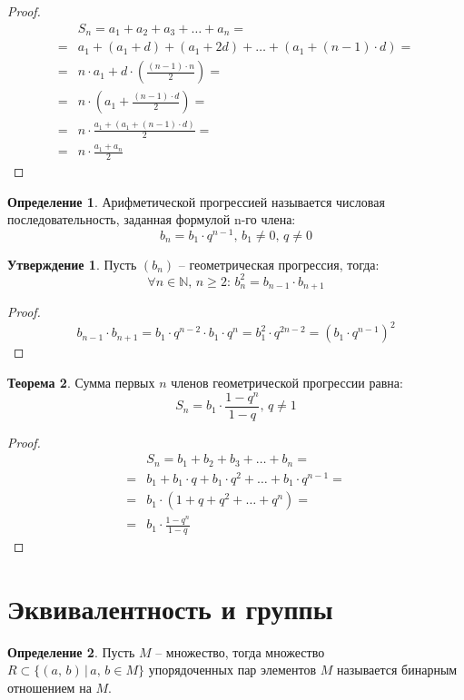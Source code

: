 \documentclass[12pt]{article}
\theoremstyle{definition}
\newtheorem{theorem}{Теорема}[section]
\newtheorem{definition}{Определение}
\newtheorem{statement}[theorem]{Утверждение}
\newcommand{\N}{\mathbb{N}}
\begin{document}
\begin{proof}
    \begin{align*}
        &S_n=a_1+a_2+a_3+\ldots+a_n=\\
        =&a_1+(a_1+d)+(a_1+2d)+\ldots+(a_1+(n-1)\cdot d)=\\
        =&n\cdot a_1+d\cdot \left( \frac{(n-1)\cdot n}{2} \right)=\\
        =&n\cdot \left(a_1+\frac{(n-1)\cdot d}{2} \right)=\\
        =&n \cdot \frac{a_1 + (a_1 + (n-1)\cdot d)}{2}=\\
        =&n\cdot \frac{a_1 + a_n}{2}
    \end{align*}
\end{proof}

\begin{definition}
    Арифметической прогрессией называется числовая последовательность, заданная формулой n-го члена:
    $$b_n=b_1 \cdot q^{n-1},\, b_1\neq0,\, q\neq0$$
\end{definition}

\begin{statement}
    Пусть $(b_n)$ -- геометрическая прогрессия, тогда: 
    $$\forall n\in \N,\, n\geq 2:\,b_n^2=b_{n-1}\cdot b_{n+1}$$
\end{statement}
\begin{proof}
    $$b_{n-1}\cdot b_{n+1}=b_1\cdot q^{n-2}\cdot b_1 \cdot q^n=b_1^2\cdot q^{2n-2}=(b_1\cdot q^{n-1})^2$$
\end{proof}
\begin{theorem}
    Сумма первых $n$ членов геометрической прогрессии равна:
    $$S_n=b_1\cdot \frac{1-q^n}{1-q},\, q\neq 1$$
\end{theorem}
\begin{proof}
    \begin{align*}
        &S_n=b_1+b_2+b_3+\ldots+b_n=\\
        =&b_1+b_1\cdot q+b_1\cdot q^2+\ldots+b_1\cdot q^{n-1}=\\
        =&b_1\cdot(1+q+q^2+\ldots+q^n)=\\
        =&b_1\cdot \frac{1-q^n}{1-q}
    \end{align*}
\end{proof}

\section{Эквивалентность и группы}

\begin{definition}
    Пусть $M$ -- множество, тогда множество $R \subset \{(a,\,b)\,|\,a,\,b\in M\}$ упорядоченных пар элементов $M$ называется бинарным отношением на $M$. 
\end{definition}
\end{document}
